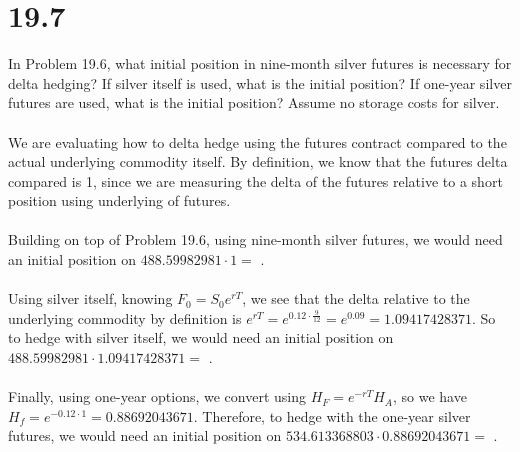 \documentclass{article}
\begin{document}
{\Large 

\section*{19.7}
In Problem 19.6, what initial position in nine-month silver futures is necessary for delta hedging? If silver itself is used, what is the initial position? If one-year silver futures are used, what is the initial position? Assume no storage costs for silver. \\ \\
We are evaluating how to delta hedge using the futures contract compared to the actual underlying commodity itself. By definition, we know that the futures delta compared is 1, since we are measuring the delta of the futures relative to a short position using underlying of futures. \\ \\
Building on top of Problem 19.6, using nine-month silver futures, we would need an initial position on \(488.59982981 \cdot 1 = \) . \\ \\
Using silver itself, knowing \(F_0 = S_0 e^{rT}\), we see that the delta relative to the underlying commodity by definition is \(e^{rT} = e^{0.12 \cdot \frac{9}{12}} = e^{0.09} = 1.09417428371\). So to hedge with silver itself, we would need an initial position on \(488.59982981 \cdot 1.09417428371 = \) . \\ \\
Finally, using one-year options, we convert using \(H_F = e^{-rT} H_A\), so we have \(H_f = e^{-0.12 \cdot 1} = 0.88692043671\). Therefore, to hedge with the one-year silver futures, we would need an initial position on \(534.613368803 \cdot 0.88692043671 = \) .

}
\end{document}
